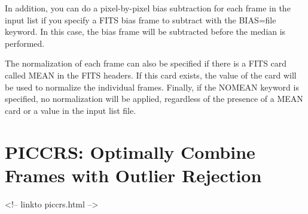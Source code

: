 In addition, you can do a pixel-by-pixel bias subtraction for each frame in
the input list if you specify a FITS bias frame to subtract with the
BIAS=file keyword. In this case, the bias frame will be subtracted before
the median is performed.

The normalization of each frame can also be specified if there is a FITS
card called MEAN in the FITS headers. If this card exists, the value of the
card will be used to normalize the individual frames. Finally, if the
NOMEAN keyword is specified, no normalization will be applied, regardless
of the presence of a MEAN card or a value in the input list file.

\section{PICCRS: Optimally Combine Frames with Outlier Rejection}
\begin{rawhtml}
<!-- linkto piccrs.html -->
\end{rawhtml}

